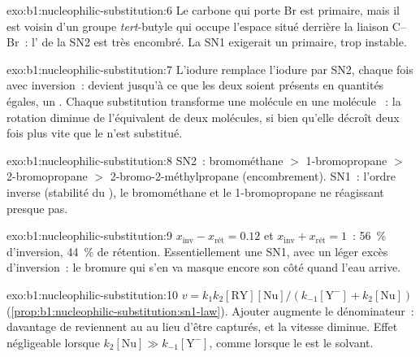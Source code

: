 \begin{solution}{exo:b1:nucleophilic-substitution:6}
Le carbone qui porte Br est primaire, mais il est voisin d'un groupe
\textit{tert}-butyle qui occupe l'espace situé derrière la liaison
C--Br~: l' de la SN2 est très encombré. La SN1
exigerait un  primaire, trop instable.
\end{solution}

\begin{solution}{exo:b1:nucleophilic-substitution:7}
L'iodure remplace l'iodure par SN2, chaque fois avec inversion~:
 devient  jusqu'à ce que les deux soient présents en
quantités égales, un . Chaque substitution transforme
une molécule  en une molécule ~: la rotation diminue de
l'équivalent de deux molécules, si bien qu'elle décroît deux fois plus
vite que le  n'est substitué.
\end{solution}

\begin{solution}{exo:b1:nucleophilic-substitution:8}
SN2~: bromométhane $>$ 1-bromopropane $>$ 2-bromopropane $>$
2-bromo-2-méthylpropane (encombrement). SN1~: l'ordre inverse
(stabilité du ), le bromométhane et le 1-bromopropane ne
réagissant presque pas.
\end{solution}

\begin{solution}{exo:b1:nucleophilic-substitution:9}
$x_{\text{inv}} - x_{\text{rét}} = 0.12$ et $x_{\text{inv}} + x_{\text{rét}} = 1$~:
\qty{56}{\percent} d'inversion, \qty{44}{\percent} de rétention.
Essentiellement une  SN1, avec un léger excès d'inversion~:
le bromure qui s'en va masque encore son côté quand l'eau arrive.
\end{solution}

\begin{solution}{exo:b1:nucleophilic-substitution:10}
$v = k_1k_2[\mathrm{RY}][\mathrm{Nu}]/(k_{-1}[\mathrm{Y^-}] + k_2[\mathrm{Nu}])$
(\cref{prop:b1:nucleophilic-substitution:sn1-law}). Ajouter 
augmente le dénominateur~: davantage de  reviennent au
 au lieu d'être capturés, et la vitesse diminue. Effet
négligeable lorsque
$k_2[\mathrm{Nu}] \gg k_{-1}[\mathrm{Y^-}]$, comme lorsque le 
est le solvant.
\end{solution}

